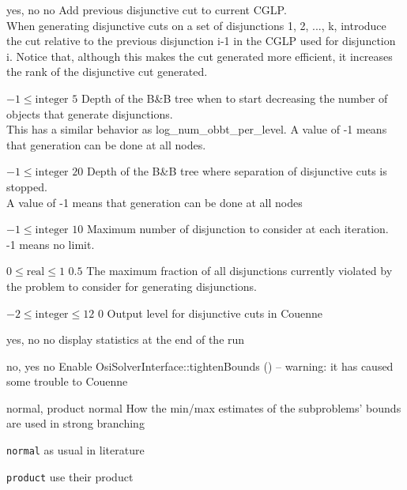 %
{\ttfamily yes, no}%
{no}%
{Add previous disjunctive cut to current CGLP.\\
When generating disjunctive cuts on a set of disjunctions 1, 2, ..., k, introduce the cut relative to the previous disjunction i-1 in the CGLP used for disjunction i. Notice that, although this makes the cut generated more efficient, it increases the rank of the disjunctive cut generated.}%
{}

%
{$-1\leq\textrm{integer}$}%
{$5$}%
{Depth of the B\&B tree when to start decreasing the number of objects that generate disjunctions.\\
This has a similar behavior as log\_num\_obbt\_per\_level. A value of -1 means that generation can be done at all nodes.}%
{}

%
{$-1\leq\textrm{integer}$}%
{$20$}%
{Depth of the B\&B tree where separation of disjunctive cuts is stopped.\\
A value of -1 means that generation can be done at all nodes}%
{}

%
{$-1\leq\textrm{integer}$}%
{$10$}%
{Maximum number of disjunction to consider at each iteration.\\
-1 means no limit.}%
{}

%
{$0\leq\textrm{real}\leq1$}%
{$0.5$}%
{The maximum fraction of all disjunctions currently violated by the problem to consider for generating disjunctions.}%
{}

%
{$-2\leq\textrm{integer}\leq12$}%
{$0$}%
{Output level for disjunctive cuts in Couenne}%
{}

%
{\ttfamily yes, no}%
{no}%
{display statistics at the end of the run}%
{}

%
{\ttfamily no, yes}%
{no}%
{Enable OsiSolverInterface::tightenBounds () -- warning: it has caused some trouble to Couenne}%
{}

%
{\ttfamily normal, product}%
{normal}%
{How the min/max estimates of the subproblems' bounds are used in strong branching}%
{\begin{list}{}{
\setlength{\parsep}{0em}
\setlength{\leftmargin}{5ex}
\setlength{\labelwidth}{2ex}
\setlength{\itemindent}{0ex}
\setlength{\topsep}{0pt}}
\item[\texttt{normal}] as usual in literature
\item[\texttt{product}] use their product
\end{list}
}

